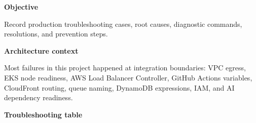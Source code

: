 \vspace{0.5em}\noindent\textbf{Objective}\par

Record production troubleshooting cases, root causes, diagnostic
commands, resolutions, and prevention steps.

\vspace{0.5em}\noindent\textbf{Architecture context}\par

Most failures in this project happened at integration boundaries: VPC
egress, EKS node readiness, AWS Load Balancer Controller, GitHub Actions
variables, CloudFront routing, queue naming, DynamoDB expressions, IAM,
and AI dependency readiness.

\vspace{0.5em}\noindent\textbf{Troubleshooting table}\par


